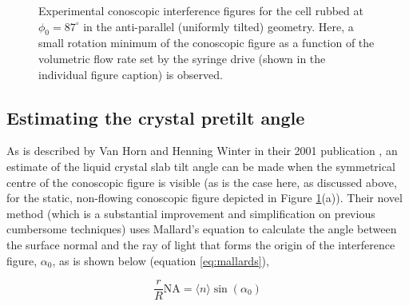 \begin{figure}
\begin{center}
\end{center}
\caption[Experimental conoscopic figures for the uniformly aligned state]{\label{fig:uniform_data}Experimental conoscopic interference figures for the cell rubbed at $\phi_0=87^{\circ}$ in the anti-parallel (uniformly tilted) geometry. Here, a small rotation minimum of the conoscopic figure as a function of the volumetric flow rate set by the syringe drive (shown in the individual figure caption) is observed.}
\end{figure}

\subsection{Estimating the crystal pretilt angle}
\label{sec:calc_tilt}
As is described by Van Horn and Henning Winter in their 2001 publication \cite{Horn2001}, an estimate of the liquid crystal slab tilt angle can be made when the symmetrical centre of the conoscopic figure is visible (as is the case here, as discussed above, for the static, non-flowing conoscopic figure depicted in Figure \ref{fig:uniform_data}(a)). Their novel method (which is a substantial improvement and simplification on previous cumbersome techniques) uses Mallard's equation \cite{Mallard1882,Horn2001} to calculate the angle between the surface normal and the ray of light that forms the origin of the interference figure, $\alpha_0$, as is shown below (equation \ref{eq:mallards}),

\begin{equation}
\label{eq:mallards}
\frac{r}{R}\text{NA}=\langle n\rangle\sin\left(\alpha_0\right)
\end{equation}

